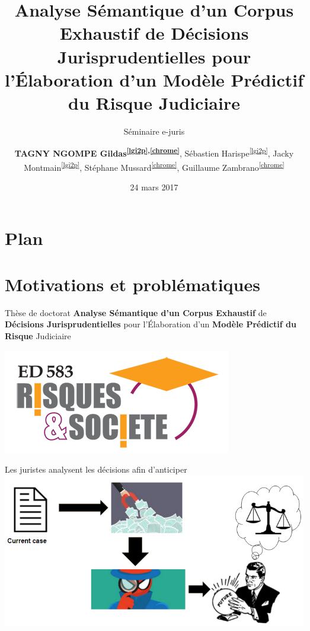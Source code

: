 \documentclass[newPxFont,pagenumber]{beamer}
\title{\normalsize Analyse Sémantique d'un Corpus Exhaustif de Décisions Jurisprudentielles pour l'Élaboration d'un Modèle Prédictif du Risque Judiciaire}
\subtitle{\small Séminaire e-juris
}
\date{\scriptsize 24 mars 2017}
\author{\textbf{TAGNY NGOMPE Gildas\textsuperscript{\ref{lgi2p},\ref{chrome}}}, Sébastien Harispe\textsuperscript{\ref{lgi2p}}, Jacky Montmain\textsuperscript{\ref{lgi2p}}, Stéphane Mussard\textsuperscript{\ref{chrome}}, Guillaume Zambrano\textsuperscript{\ref{chrome}}}
\institute{%
\begin{enumerate}
\item LGI2P (École des mines d'Alès) \label{lgi2p}
\item CHROME EA 7352 (Université de Nîmes) \label{chrome}
\end{enumerate}
}
\makeatletter
\newcommand*{\currentname}{\@currentlabelname}
\makeatother
\begin{document}
\nocite{}
%
%
\begin{frame}[plain]
	\titlepage
\end{frame}
%
%
\section*{Plan}
\begin{frame}[c]{\currentname}
\tableofcontents[hideallsubsections]
\end{frame}
%
%
\section{Motivations et problématiques}
\begin{frame}[c]{Thèse de doctorat}
\Large\textbf{Analyse Sémantique d'un Corpus Exhaustif} de \textbf{Décisions
Jurisprudentielles} pour l'Élaboration d'un \textbf{Modèle Prédictif du
Risque} Judiciaire

\vspace{0.4cm}

\hfill\includegraphics[scale=0.25]{ED583.jpg}
\end{frame}

\begin{frame}[c]{Les juristes analysent les décisions afin d'anticiper}
\includegraphics[width=\textwidth]{lawyerwork.PNG}
\end{frame}
\end{document}
